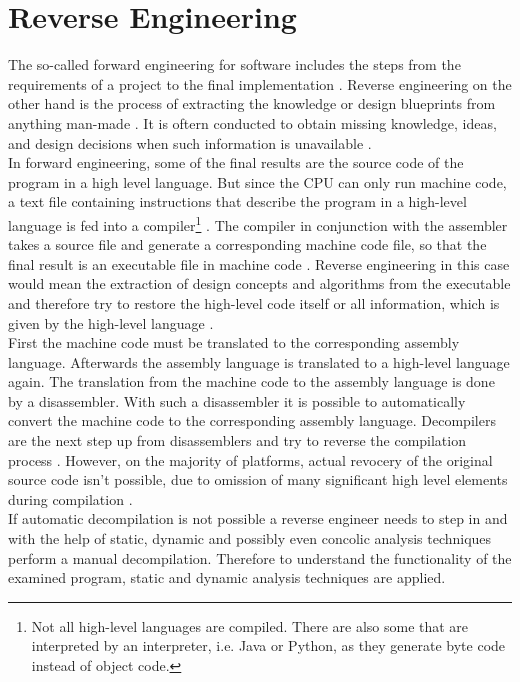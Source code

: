 \documentclass[10pt,twoside,a4paper,bibliography=totoc]{scrbook}
\begin{document}
\section{Reverse Engineering}
\label{sec2:re}
The so-called forward engineering for software includes the steps from the requirements of a project to the final implementation \cite{reeng}. 
Reverse engineering on the other hand is the process of extracting the knowledge or design blueprints from anything man-made \cite{eilam}. It is oftern conducted to obtain missing knowledge, ideas, and design decisions when such information is unavailable \cite{eilam}. \\
In forward engineering, some of the final results are the source code of the program in a high level language\cite{reeng}. But since the CPU can only run machine code, a text file containing instructions that describe the program in a high-level language is fed into a compiler\footnote{Not all high-level languages are compiled. There are also some that are interpreted by an interpreter, i.e. Java or Python, as they generate byte code instead of object code.} \cite{eilam}. 
The compiler  in conjunction with the assembler takes a source file and generate a corresponding machine code file, so that the final result is an executable file in machine code \cite{eilam, copypro}.
Reverse engineering in this case would mean the extraction of design concepts and algorithms from the executable and therefore try to restore the high-level code itself or all information, which is given by the high-level language \cite{eilam}.\\
First the machine code must be translated to the corresponding assembly language. Afterwards the assembly language is translated to a high-level language again.
The translation from the machine code to the assembly language is done by a disassembler.
With such a disassembler it is possible to automatically convert the machine code to the corresponding assembly language.
Decompilers are the next step up from disassemblers and try to reverse the compilation process \cite{eilam}. However, on the majority of platforms, actual revocery of the original source code isn't possible, due to omission of many significant high level elements during compilation \cite{eilam}.\\
If automatic decompilation is not possible a reverse engineer needs to step in and with the help of static, dynamic and possibly even concolic analysis techniques perform a manual decompilation.
Therefore to understand the functionality of the examined program, static and dynamic analysis techniques are applied.
\end{document}
